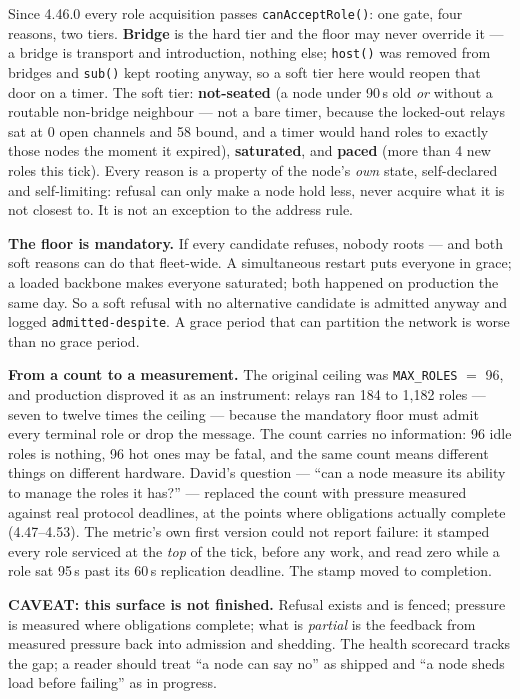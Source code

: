 \documentclass[nobib]{tufte-handout}
\begin{document}
Since 4.46.0 every role acquisition passes \texttt{canAcceptRole()}:
one gate, four reasons, two tiers. \textbf{Bridge} is the hard tier and
the floor may never override it --- a bridge is transport and
introduction, nothing else; \texttt{host()} was removed from bridges
and \texttt{sub()} kept rooting anyway, so a soft tier here would
reopen that door on a timer. The soft tier: \textbf{not-seated} (a
node under 90\,s old \emph{or} without a routable non-bridge neighbour
--- not a bare timer, because the locked-out relays sat at 0 open
channels and 58 bound, and a timer would hand roles to exactly those
nodes the moment it expired), \textbf{saturated}, and \textbf{paced}
(more than 4 new roles this tick). Every reason is a property of the
node's \emph{own} state, self-declared and self-limiting: refusal can
only make a node hold less, never acquire what it is not closest to.
It is not an exception to the address rule.

\textbf{The floor is mandatory.} If every candidate refuses, nobody
roots --- and both soft reasons can do that fleet-wide. A simultaneous
restart puts everyone in grace; a loaded backbone makes everyone
saturated; both happened on production the same day. So a soft refusal
with no alternative candidate is admitted anyway and logged
\texttt{admitted-despite}. A grace period that can partition the
network is worse than no grace period.

\textbf{From a count to a measurement.} The original ceiling was
\texttt{MAX\_ROLES} $=$ 96, and production disproved it as an
instrument: relays ran 184 to 1{,}182 roles --- seven to twelve times
the ceiling --- because the mandatory floor must admit every terminal
role or drop the message. The count carries no information: 96 idle
roles is nothing, 96 hot ones may be fatal, and the same count means
different things on different hardware. David's question --- ``can a
node measure its ability to manage the roles it has?'' --- replaced
the count with pressure measured against real protocol deadlines, at
the points where obligations actually complete (4.47--4.53). The
metric's own first version could not report failure: it stamped every
role serviced at the \emph{top} of the tick, before any work, and read
zero while a role sat 95\,s past its 60\,s replication deadline. The
stamp moved to completion.

\textbf{CAVEAT: this surface is not finished.} Refusal exists and is
fenced; pressure is measured where obligations complete; what is
\emph{partial} is the feedback from measured pressure back into
admission and shedding. The health scorecard tracks the gap; a reader
should treat ``a node can say no'' as shipped and ``a node sheds load
before failing'' as in progress.
\end{document}
